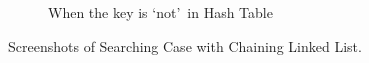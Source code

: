 \begin{itemize}
\begin{figure}[!ht]
\begin{subfigure}{0.45\textwidth}
			      \caption{When the key is `not'~in Hash Table}\label{fig:chainingll-notfound-metric}
		      \end{subfigure}

		      \caption{Screenshots of Searching Case with Chaining Linked List.}\label{fig:chainingll-search-metric}
	      \end{figure}
\end{itemize}